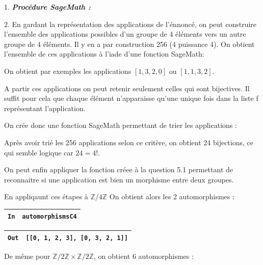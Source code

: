 \documentclass[titlepage]{article}
\begin{document}
    1. \emph{\textbf{Procédure SageMath :}}

    



    2. En gardant la représentation des applications de l'énnoncé, on peut construire l'ensemble des applications possibles d'un groupe de 4 éléments vers un autre groupe de 4 éléments.
    Il y en a par construction 256 (4 puissance 4). On obtient l'ensemble de ces applications à l'iade d'une fonction SageMath:

    

    On obtient par exemples les applications $[1, 3, 2, 0]$ ou $[1, 1, 3, 2]$.

    A partir ces applications on peut retenir seulement celles qui sont bijectives. Il suffit pour cela que chaque élément n'apparaisse qu'une unique fois dans la liste f représentant l'application.

    On crée donc une fonction SageMath permettant de trier les applications :

    

    Après avoir trié les 256 applications selon ce critère, on obtient 24 bijections, ce qui semble logique car $24 = 4!$.

    On peut enfin appliquer la fonction créee à la question 5.1 permettant de reconnaitre si une application est bien un morphisme entre deux groupes.

    En appliqaunt ces étapes à $\mathbb{Z}/4\mathbb{Z}$ On obtient alors les 2 automorphismes :

    \begin{tabularx}{11.5cm}{|p{0.60cm}|X|}
        \hline
        \verb|In|
        & 
        \verb|automorphismsC4|
        \\
        \hline
    \end{tabularx}

    \begin{tabularx}{11.5cm}{|p{0.60cm}|X|}
        \hline
        \verb|Out|
        & 
        \verb|[[0, 1, 2, 3], [0, 3, 2, 1]]|
        \\
        \hline
    \end{tabularx}\newline

    De même pour $\mathbb{Z}/2\mathbb{Z}\times\mathbb{Z}/2\mathbb{Z}$, on obtient 6 automorphismes :
\end{document}
